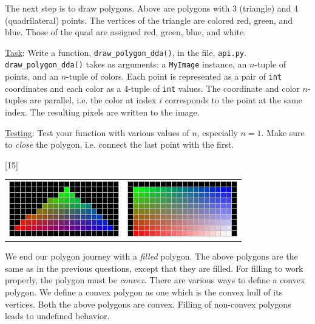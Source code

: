 \documentclass[addpoints]{exam}
\begin{document}
\begin{questions}
  The next step is to draw polygons. Above are polygons with 3 (triangle) and 4 (quadrilateral) points. The vertices of the triangle are colored red, green, and blue. Those of the quad are assigned red, green, blue, and white.
  
  \underline{Task}: Write a function, \texttt{draw\_polygon\_dda()}, in the file, \texttt{api.py}. \texttt{draw\_polygon\_dda()} takes as arguments: a \texttt{MyImage} instance, an $n$-tuple of points, and an $n$-tuple of colors. Each point is represented as a pair of \texttt{int} coordinates and each color as a 4-tuple of \texttt{int} values. The coordinate and color $n$-tuples are parallel, i.e. the color at index $i$ corresponds to the point at the same index. The resulting pixels are written to the image.

  \underline{Testing}: Test your function with various values of $n$, especially $n=1$. Make sure to \textit{close} the polygon, i.e. connect the last point with the first.

[15]

  \begin{center}
    \begin{tabular}{cc}
      \includegraphics[align=t]{tri-fill} & \includegraphics[align=t]{quad-fill}
    \end{tabular}
  \end{center}

  We end our polygon journey with a \textit{filled} polygon. The above polygons are the same as in the previous questions, except that they are filled. For filling to work properly, the polygon must be \textit{convex}. There are various ways to define a convex polygon. We define a convex polygon as one which is the convex hull of its vertices. Both the above polygons are convex. Filling of non-convex polygons leads to undefined behavior.


\end{questions}
\end{document}
